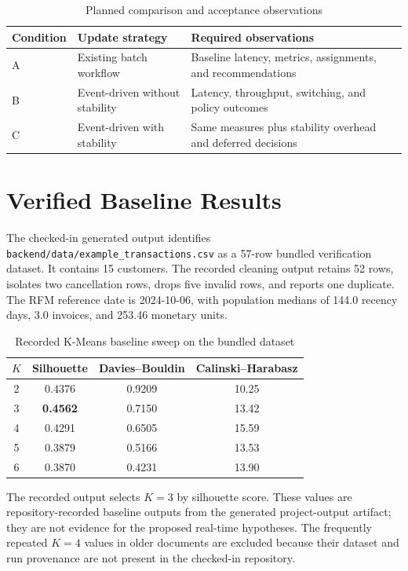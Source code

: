 \documentclass[conference]{IEEEtran}
\begin{document}
\begin{table}[!t]
\caption{Planned comparison and acceptance observations}
\label{tab:experiments}
\centering
\small
\begin{tabular}{p{}p{}p{}}
\toprule
Condition & Update strategy & Required observations \\
\midrule
A & Existing batch workflow & Baseline latency, metrics, assignments, and recommendations \\
B & Event-driven without stability & Latency, throughput, switching, and policy outcomes \\
C & Event-driven with stability & Same measures plus stability overhead and deferred decisions \\
\bottomrule
\end{tabular}
\end{table}

\section{Verified Baseline Results}
The checked-in generated output identifies \texttt{backend/data/example\_transactions.csv} as a 57-row bundled verification dataset. It contains 15 customers. The recorded cleaning output retains 52 rows, isolates two cancellation rows, drops five invalid rows, and reports one duplicate. The RFM reference date is 2024-10-06, with population medians of 144.0 recency days, 3.0 invoices, and 253.46 monetary units.

\begin{table}[!t]
\caption{Recorded K-Means baseline sweep on the bundled dataset}
\label{tab:baseline-metrics}
\centering
\small
\begin{tabular}{c c c c}
\toprule
$K$ & Silhouette & Davies--Bouldin & Calinski--Harabasz \\
\midrule
2 & 0.4376 & 0.9209 & 10.25 \\
3 & \textbf{0.4562} & 0.7150 & 13.42 \\
4 & 0.4291 & 0.6505 & 15.59 \\
5 & 0.3879 & 0.5166 & 13.53 \\
6 & 0.3870 & 0.4231 & 13.90 \\
\bottomrule
\end{tabular}
\end{table}

The recorded output selects $K=3$ by silhouette score. These values are repository-recorded baseline outputs from the generated project-output artifact; they are not evidence for the proposed real-time hypotheses. The frequently repeated $K=4$ values in older documents are excluded because their dataset and run provenance are not present in the checked-in repository.
\end{document}
